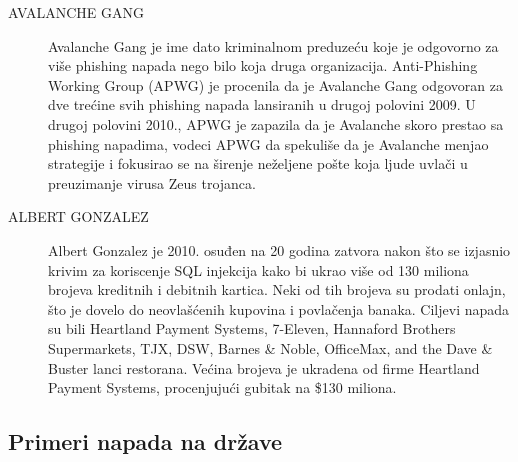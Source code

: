 \documentclass[a4paper]{article}
\theoremstyle{break}
\begin{document}
{\begin{description}
\item[AVALANCHE GANG] Avalanche Gang je ime dato kriminalnom preduzeću koje je odgovorno za više phishing napada nego bilo koja druga organizacija. Anti-Phishing Working Group (APWG) je procenila da je Avalanche Gang odgovoran za dve trećine svih phishing napada lansiranih u drugoj polovini 2009. U drugoj polovini 2010., APWG je zapazila da je Avalanche skoro prestao sa phishing napadima, vodeci APWG da spekuliše da je Avalanche menjao strategije i fokusirao se na širenje neželjene pošte koja ljude uvlači u preuzimanje virusa Zeus trojanca.
\item[ALBERT GONZALEZ] Albert Gonzalez je 2010. osuđen na 20 godina zatvora nakon što se izjasnio krivim za koriscenje SQL injekcija kako bi ukrao više od 130 miliona brojeva kreditnih i debitnih kartica. Neki od tih brojeva su prodati onlajn, što je dovelo do neovlašćenih kupovina i povlačenja banaka. Ciljevi napada su bili Heartland Payment Systems,  7-Eleven,  Hannaford Brothers Supermarkets,  TJX,  DSW,  Barnes \& Noble, OfficeMax, and the Dave \& Buster lanci restorana. Većina brojeva je ukradena od firme Heartland Payment Systems, procenjujući gubitak na \$130 miliona.
\end{description}

\subsection{Primeri napada na države}
\label{subsec:primeri_napada_drzave}

}
\end{document}
